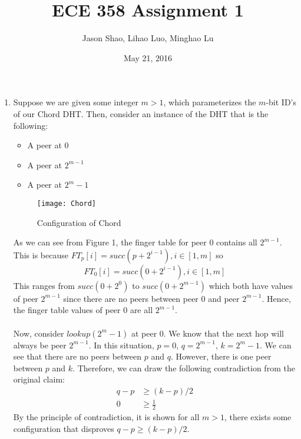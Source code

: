 \documentclass[12pt]{article}
\title{ECE 358 Assignment 1}
\author{Jason Shao, Lihao Luo, Minghao Lu}
\date{May 21, 2016}
\begin{document}
\maketitle
\renewcommand{\thesubsection}{Problem \arabic{subsection}}


\def\question#1{\item[\bf #1.]}
\def\part#1{\item[\bf #1)]}
\newcommand{\pc}[1]{\mbox{\textbf{#1}}} %

\begin{enumerate}
    \item 
    Suppose we are given some integer $m > 1$, which parameterizes the $m$-bit ID's of our Chord DHT. Then, consider an instance of the DHT that is the following:
    \begin{itemize}
        \item A peer at 0
        \item A peer at $2^{m-1}$
        \item A peer at $2^{m} - 1$
    \end{itemize}
    
    \begin{figure}[!ht]
    \centering
    \texttt{[image: Chord]}
    \caption{Configuration of Chord}
	\end{figure}
    As we can see from Figure 1, the finger table for peer 0 contains all $2^{m-1}$. This is because $FT_p[i] = succ(p + 2^{i-1}) , i \in [1,m]$ so $$FT_0[i] = succ(0 + 2^{i-1}), i \in [1, m]$$
    This ranges from $succ(0 + 2^0)$ to $succ(0 + 2^{m-1})$ which both have values of peer $2^{m-1}$ since there are no peers between peer 0 and peer $2^{m-1}$. Hence, the finger table values of peer 0 are all $2^{m-1}$. \\ \\
    Now, consider $lookup(2^m - 1)$ at peer 0. We know that the next hop will always be peer $2^{m-1}$. In this situation, $p = 0$, $q = 2^{m-1}$, $k = 2^m - 1$. We can see that there are no peers between $p$ and $q$. However, there is one peer between $p$ and $k$. Therefore, we can draw the following contradiction from the original claim:
    \begin{align*}
    q - p &\ge (k-p)/2 \\
    0 &\ge \frac{1}{2}
    \end{align*}
    By the principle of contradiction, it is shown for all $m > 1$, there exists some configuration that disproves $ q - p \ge (k-p)/2 $.
    

\end{enumerate}
\end{document}
